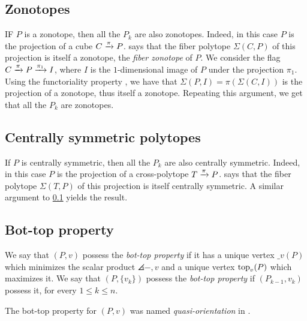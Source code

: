 \subsection{Zonotopes} \label{ss:zonotopes}

IF $P$ is a zonotope, then all the $P_k$ are also zonotopes.
Indeed, in this case $P$ is the projection of a cube $C \xrightarrow{\pi} P$.
\cite[Theorem 4.1]{BilleraSturmfels92} says that the fiber polytope $\Sigma(C,P)$ of this projection is itself a zonotope, the \emph{fiber zonotope} of $P$.
We consider the flag $C \xrightarrow{\pi} P \xrightarrow{\pi_1} I$, where $I$ is the $1$-dimensional image of $P$ under the projection $\pi_1$.
Using the functoriality property \cite[Lemma 2.3]{BilleraSturmfels92}, we have that $\Sigma(P,I)=\pi(\Sigma(C,I))$ is the projection of a zonotope, thus itself a zonotope.
Repeating this argument, we get that all the $P_k$ are zonotopes.

\subsection{Centrally symmetric polytopes} \label{ss:centrally-symmetric}

If $P$ is centrally symmetric, then all the $P_k$ are also centrally symmetric.
Indeed, in this case $P$ is the projection of a cross-polytope $T \xrightarrow{\pi} P$.
\cite[Theorem 5.1]{BilleraSturmfels92} says that the fiber polytope $\Sigma(T,P)$ of this projection is itself centrally symmetric.
A similar argument to \cref{ss:zonotopes} yields the result.

\subsection{Bot-top property}


We say that $(P,v)$ possess the \emph{bot-top property} if it has a unique vertex $\bm_v(P)$ which minimizes the scalar product $\angles{-,v}$ and a unique vertex $\operatorname{top}_v(P)$ which maximizes it.
We say that $(P,\{v_k\})$ possess the \emph{bot-top property} if $(P_{k-1}, v_k)$ possess it, for every $1\leq k \leq n$.

The bot-top property for $(P,v)$ was named \emph{quasi-orientation} in \cite[Definition 1.11]{GLA21}.

